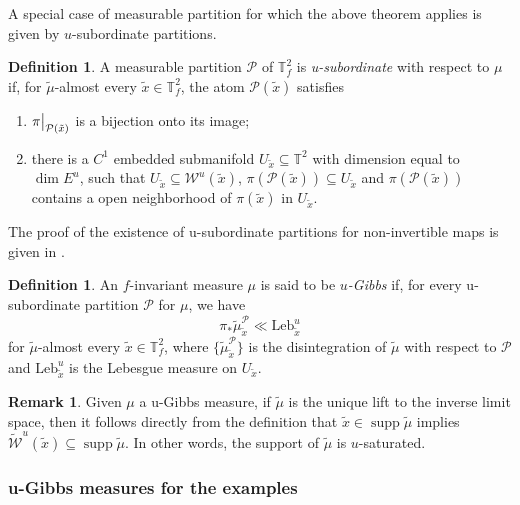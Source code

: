\documentclass[a4paper,11pt,reqno]{amsart}
\newcommand\restr[2]{{ %
  \left.\kern-\nulldelimiterspace 
  #1 
  \vphantom{\big|} 
  \right|_{#2} 
  }}
\newcommand{\TT}{{\mathbb{T}^2}}
\newcommand{\TTf}{{\mathbb{T}_f^2}}
\newcommand{\cW}{{\mathcal W}}
\newcommand{\Leb}{\textrm{Leb}}
\newcommand{\tix}{\tilde{x}}
\newcommand{\w}{\widetilde{\cW}}
\theoremstyle{definition}
\newtheorem{definition}[theorem]{Definition}
\newtheorem{remark}{Remark}
\begin{document}
A special case of measurable partition for which the above theorem applies is given by $u$-subordinate partitions.

\begin{definition}
	\label{def:u-subord}
	A measurable partition $\mathcal{P}$ of $\TTf$ is \emph{u-subordinate} with respect to $\mu$ if, for $\tilde{\mu}$-almost every $\tilde{x} \in \TTf$, the atom $\mathcal{P}(\tilde{x})$ satisfies
	\begin{enumerate}
		\item $\restr{\pi}{\mathcal{P}(\tilde{x})}$ is a bijection onto its image;
		\item there is a $C^1$ embedded submanifold $U_{\tilde{x}} \subseteq \TT$ with dimension equal to $\dim E^u$, such that $U_{\tilde{x}} \subseteq \cW^u(\tilde{x})$, $\pi(\mathcal{P}(\tilde{x})) \subseteq U_{\tilde{x}}$ and $\pi(\mathcal{P}(\tilde{x}))$ contains a open neighborhood of $\pi(\tilde{x})$ in $U_{\tilde{x}}$.
	\end{enumerate}
\end{definition}

The proof of the existence of u-subordinate partitions for non-invertible maps is given in \cite[\S IX.2.2]{QXZ2009}.

\begin{definition}
	\label{def:u-gibbs}
	An $f$-invariant measure $\mu$ is said to be \emph{$u$-Gibbs} if, for every u-subordinate partition $\mathcal{P}$ for $\mu$, we have 
	$$\pi_*\tilde{\mu}^{\mathcal{P}}_{\tilde{x}} \ll \Leb^u_{\tilde{x}}$$
	for $\tilde{\mu}$-almost every $\tilde{x} \in\TTf$, where $\{\tilde{\mu}^{\mathcal{P}}_{\tilde{x}}\}$ is the disintegration of $\tilde{\mu}$ with respect to $\mathcal{P}$ and $\Leb^u_{\tilde{x}}$ is the Lebesgue measure on $U_{\tilde{x}}$.
\end{definition}

\begin{remark}
    \label{rem:supp-u-sat}
Given $\mu$ a u-Gibbs measure, if $\tilde{\mu}$ is the unique lift to the inverse limit space, then it follows directly from the definition that $\tix \in \operatorname{supp} \tilde{\mu}$ implies $\w^u(\tilde{x}) \subseteq \operatorname{supp} \tilde{\mu}$. In other words, the support of $\tilde{\mu}$ is $u$-saturated.
\end{remark}

\subsubsection{u-Gibbs measures for the examples}
\label{sec:u-gibbs-ex}
\end{document}
